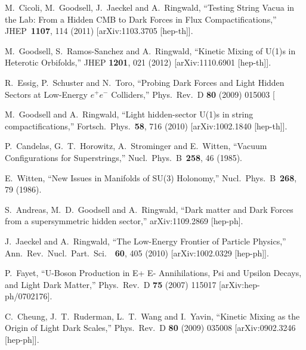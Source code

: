  
  M.~Cicoli, M.~Goodsell, J.~Jaeckel and A.~Ringwald,
  ``Testing String Vacua in the Lab: From a Hidden CMB to Dark Forces in Flux Compactifications,''
  JHEP\ {\bf 1107}, 114  (2011)
  [arXiv:1103.3705 [hep-th]].

 M.~Goodsell, S.~Ramos-Sanchez and A.~Ringwald,
 ``Kinetic Mixing of U(1)s in Heterotic Orbifolds,''
 JHEP {\bf 1201}, 021 (2012)
 [arXiv:1110.6901 [hep-th]].

R.~Essig, P.~Schuster and N.~Toro,
``Probing Dark Forces and Light Hidden Sectors at Low-Energy $e^+e^-$ Colliders,''
Phys.\ Rev.\ D {\bf 80} (2009) 015003
[%

  M.~Goodsell and A.~Ringwald,
  ``Light hidden-sector U(1)s in string compactifications,''
  Fortsch.\ Phys.\  {\bf 58}, 716 (2010)
  [arXiv:1002.1840 [hep-th]].
 
  P.~Candelas, G.~T.~Horowitz, A.~Strominger and E.~Witten,
  ``Vacuum Configurations for Superstrings,''
  Nucl.\ Phys.\ B\ {\bf 258}, 46  (1985).

  E.~Witten,
  ``New Issues in Manifolds of SU(3) Holonomy,''
  Nucl.\ Phys.\ B\ {\bf 268}, 79  (1986).

 S.~Andreas, M.~D.~Goodsell and A.~Ringwald,
 ``Dark matter and Dark Forces from a supersymmetric hidden sector,''
 arXiv:1109.2869 [hep-ph].

  J.~Jaeckel and A.~Ringwald,
  ``The Low-Energy Frontier of Particle Physics,''
  Ann.\ Rev.\ Nucl.\ Part.\ Sci.\ \ {\bf 60}, 405  (2010)
  [arXiv:1002.0329 [hep-ph]].

P.~Fayet,
``U-Boson Production in E+ E- Annihilations, Psi and Upsilon Decays, and Light Dark Matter,''
Phys.\ Rev.\ D {\bf 75} (2007) 115017
[arXiv:hep-ph/0702176].

C.~Cheung, J.~T.~Ruderman, L.~T.~Wang and I.~Yavin,
``Kinetic Mixing as the Origin of Light Dark Scales,''
Phys.\ Rev.\ D {\bf 80} (2009) 035008
[arXiv:0902.3246 [hep-ph]].

